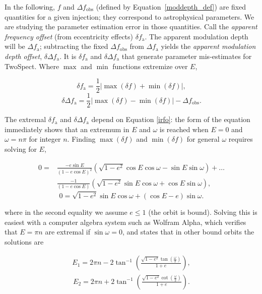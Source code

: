\documentclass{article}
\begin{document}
In the following, $f$ and $\Delta f_\mathrm{obs}$ (defined by Equation~\ref{moddepth_def}) are fixed quantities for a given injection; they correspond to astrophysical parameters.
We are studying the parameter estimation error in those quantities.
Call the \textit{apparent frequency offset} (from eccentricity effects) $\delta f_\mathrm{a}$.
The apparent modulation depth will be $\Delta f_\mathrm{a}$; subtracting the fixed $\Delta f_\mathrm{obs}$ from $\Delta f_\mathrm{a}$ yields the \textit{apparent modulation depth offset}, $\delta \Delta f_\mathrm{a}$.
It is $\delta f_\mathrm{a}$ and $\delta \Delta f_\mathrm{a}$ that generate parameter mis-estimates for TwoSpect.
Where $\max$ and $\min$ functions extremize over $E$,

\begin{equation}
\delta f_\mathrm{a} = \frac{1}{2} \left| \max(\delta f) + \min(\delta f)\right|,
\label{dfa}
\end{equation}
\begin{equation}
\delta \Delta f_\mathrm{a} = \frac{1}{2} \left| \max(\delta f) - \min(\delta f)\right| - \Delta f_\mathrm{obs}.
\label{ddfa}
\end{equation}

The extremal $\delta f_\mathrm{a}$ and $\delta \Delta f_\mathrm{a}$ depend on Equation \ref{irfo}: the form of the equation immediately shows that an extremum in $E$ and $\omega$ is reached when $E = 0$ and $\omega = n \pi$ for integer $n$.
Finding $\max(\delta f)$ and $\min(\delta f)$ for general $\omega$ requires solving for $E$,

\begin{eqnarray}
0 = &\frac{-e \sin E}{\left(1 - e \cos E \right)^{2}} \left(\sqrt{1-e^2} \cos E \cos \omega - \sin E \sin \omega \right) +\ldots \nonumber \\
    &\frac{-1}{\left(1-e \cos E \right)} \left(\sqrt{1-e^2} \sin E \cos \omega + \cos E \sin \omega \right),
\end{eqnarray}
\begin{equation}
0 = \sqrt{1-e^2} \sin E \cos \omega + (\cos E - e) \sin \omega.
\label{maxE}
\end{equation}

\noindent where in the second equality we assume $e\leq 1$ (the orbit is bound).
Solving this is easiest with a computer algebra system such as Wolfram Alpha, which verifies that $E = \pi n$ are extremal if $\sin \omega = 0$, and states that in other bound orbits the solutions are

\begin{eqnarray}
E_1 = 2 \pi n - 2 \tan^{-1} \left(\frac{\sqrt{1-e^2} \tan\left(\frac{\omega}{2}\right)}{1+e} \right),
\label{maxE1}
\end{eqnarray} 
\begin{eqnarray}
E_2 = 2 \pi n + 2 \tan^{-1} \left(\frac{\sqrt{1-e^2} \cot\left(\frac{\omega}{2}\right)}{1+e} \right).
\label{maxE2}
\end{eqnarray}
\end{document}
